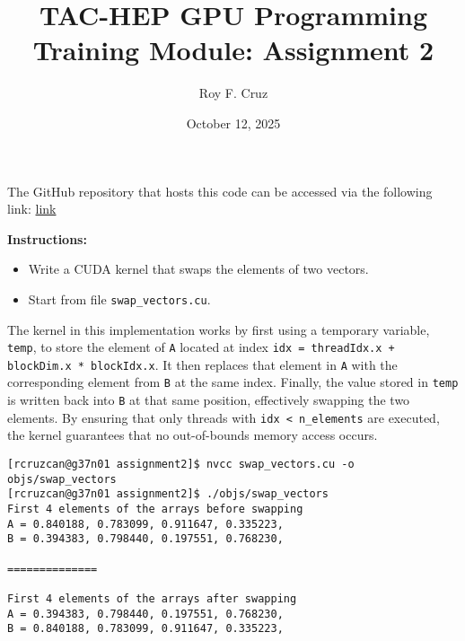 \documentclass{article}
\title{
    TAC-HEP GPU Programming Training Module: Assignment 2
}
\author{Roy F. Cruz}
\newcounter{exercise}
\newenvironment{exr}[1]{%
    \refstepcounter{exercise}
    \begin{tcolorbox}[colback=blue!5!white, colframe=blue!75!black, title=Exercise \theexercise]
    \textbf{Instructions:} #1
    \end{tcolorbox}
    \vspace{1em}
}{}
\begin{document}
\date{October 12, 2025}
\maketitle

The GitHub repository that hosts this code can be accessed via the following link: \href{https://github.com/roy-cruz/TAC-HEP_GPU-Course_Assignments/tree/master}{link}

\begin{exr}{
    \begin{itemize}
        \item Write a CUDA kernel that swaps the elements of two vectors.
        \item Start from file \texttt{swap\_vectors.cu}.
    \end{itemize}
    }
\end{exr}

The kernel in this implementation works by first using a temporary variable, \texttt{temp}, to store the element of \texttt{A} located at index \texttt{idx = threadIdx.x + blockDim.x * blockIdx.x}. It then replaces that element in \texttt{A} with the corresponding element from \texttt{B} at the same index. Finally, the value stored in \texttt{temp} is written back into \texttt{B} at that same position, effectively swapping the two elements. By ensuring that only threads with \texttt{idx < n\_elements} are executed, the kernel guarantees that no out-of-bounds memory access occurs.



\begin{lstlisting}[style=output]
[rcruzcan@g37n01 assignment2]$ nvcc swap_vectors.cu -o objs/swap_vectors
[rcruzcan@g37n01 assignment2]$ ./objs/swap_vectors 
First 4 elements of the arrays before swapping
A = 0.840188, 0.783099, 0.911647, 0.335223, 
B = 0.394383, 0.798440, 0.197551, 0.768230, 

==============

First 4 elements of the arrays after swapping
A = 0.394383, 0.798440, 0.197551, 0.768230, 
B = 0.840188, 0.783099, 0.911647, 0.335223, 
\end{lstlisting}


\end{document}
